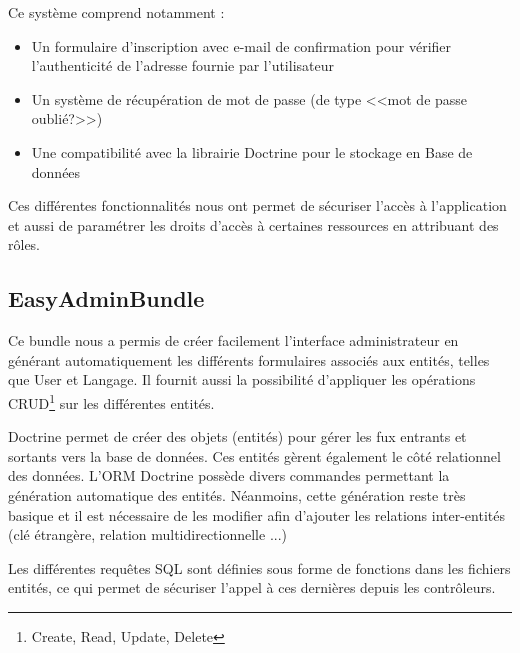 \par Ce système comprend notamment :

\begin{itemize}
	\item Un formulaire d’inscription avec e-mail de confirmation pour vérifier l'authenticité de l’adresse fournie par l'utilisateur
	\item Un système de récupération de mot de passe (de type <<mot de passe oublié?>>)
	\item Une compatibilité avec la librairie Doctrine pour le stockage en Base de données

\end{itemize}

\par Ces différentes fonctionnalités nous ont permet de sécuriser l’accès à l’application et aussi de paramétrer les droits d’accès à certaines ressources en attribuant des rôles.


\subsection{EasyAdminBundle}

\par Ce bundle nous a permis de créer facilement l’interface administrateur en générant automatiquement les différents formulaires associés aux entités, telles que User et Langage. Il fournit aussi la possibilité d’appliquer les opérations CRUD\footnote{Create, Read, Update, Delete} sur les différentes entités.

\par Doctrine permet de créer des objets (entités) pour gérer les fux entrants et sortants vers la base de données. Ces entités gèrent également le côté relationnel des données. L’ORM Doctrine possède divers commandes permettant la génération automatique des entités. Néanmoins, cette génération reste très basique et il est nécessaire de les modifier afin d’ajouter les relations inter-entités (clé étrangère, relation multidirectionnelle ...) 

\par Les différentes requêtes SQL sont définies sous forme de fonctions dans les fichiers entités, ce qui permet de sécuriser l’appel à ces dernières depuis les contrôleurs.